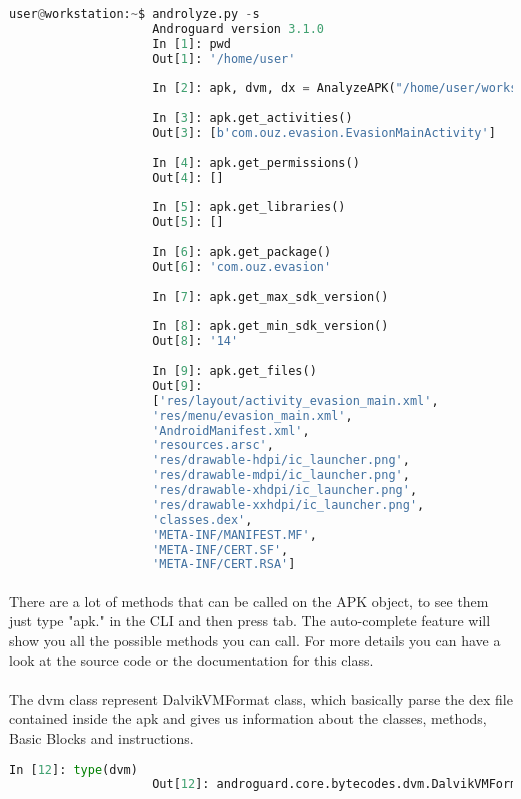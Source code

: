 \documentclass[../main.tex]{subfile}
\begin{document}
				\begin{lstlisting}[language=python]
					user@workstation:~$ androlyze.py -s
					Androguard version 3.1.0
					In [1]: pwd
					Out[1]: '/home/user'
					
					In [2]: apk, dvm, dx = AnalyzeAPK("/home/user/workspace/apps/evasion.apk")
					
					In [3]: apk.get_activities()
					Out[3]: [b'com.ouz.evasion.EvasionMainActivity']
					
					In [4]: apk.get_permissions()
					Out[4]: []
					
					In [5]: apk.get_libraries()
					Out[5]: []
					
					In [6]: apk.get_package()
					Out[6]: 'com.ouz.evasion'
					
					In [7]: apk.get_max_sdk_version()
					
					In [8]: apk.get_min_sdk_version()
					Out[8]: '14'
					
					In [9]: apk.get_files()
					Out[9]: 
					['res/layout/activity_evasion_main.xml',
					'res/menu/evasion_main.xml',
					'AndroidManifest.xml',
					'resources.arsc',
					'res/drawable-hdpi/ic_launcher.png',
					'res/drawable-mdpi/ic_launcher.png',
					'res/drawable-xhdpi/ic_launcher.png',
					'res/drawable-xxhdpi/ic_launcher.png',
					'classes.dex',
					'META-INF/MANIFEST.MF',
					'META-INF/CERT.SF',
					'META-INF/CERT.RSA']
				\end{lstlisting}
			\paragraph{} There are a lot of methods that can be called on the APK object, to see them just type "apk." in the CLI and then press tab. The auto-complete feature will show you all the possible methods you can call. For more details you can have a look at the source code or the documentation for this class.
			
			\paragraph{} The dvm class represent DalvikVMFormat class, which basically parse the dex file contained inside the apk and gives us information about the classes, methods, Basic Blocks and instructions.
				\begin{lstlisting}[language=python]
					In [12]: type(dvm)
					Out[12]: androguard.core.bytecodes.dvm.DalvikVMFormat
				\end{lstlisting}
\end{document}
